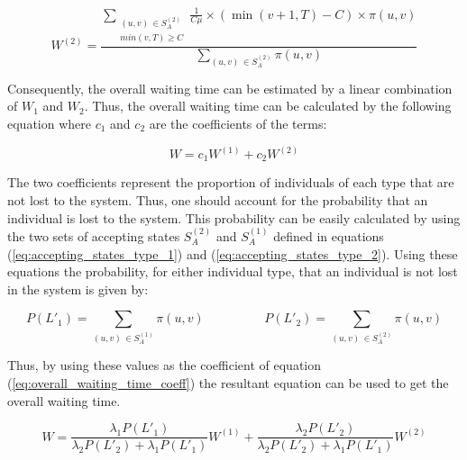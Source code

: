 \begin{equation}\label{eq:closed_form_waiting_type_2}
    W^{(2)} = \frac{\sum_{\substack{(u,v) \, \in S_A^{(2)} \\ min(v,T) \geq C}} 
    \frac{1}{C \mu} \times (\min(v+1,T)-C) \times \pi(u,v)}{\sum_{(u,v) \, 
    \in S_A^{(2)}} \pi(u,v)}
\end{equation}

Consequently, the overall waiting time can be estimated by a linear combination 
of \(W_1\) and \(W_2\). 
Thus, the overall waiting time can be calculated by the following equation where 
\(c_1\) and \(c_2\) are the coefficients of the terms:

\begin{equation}\label{eq:overall_waiting_time_coeff}
    W = c_1 W^{(1)} + c_2 W^{(2)}
\end{equation}

The two coefficients represent the proportion of individuals of each type that 
are not lost to the system.
Thus, one should account for the probability that an individual is lost to the 
system. 
This probability can be easily calculated by using the two sets of accepting 
states \(S_A^{(2)}\) and \(S_A^{(1)}\) defined in equations 
(\ref{eq:accepting_states_type_1}) and (\ref{eq:accepting_states_type_2}). 
Using these equations the probability, for either individual type, that an 
individual is not lost in the system is given by:

\begin{equation*}
    P(L'_1) = \sum_{(u,v) \, \in S_A^{(1)}} \pi(u,v) \hspace{2cm}
    P(L'_2) = \sum_{(u,v) \, \in S_A^{(2)}} \pi(u,v)
\end{equation*}
 
Thus, by using these values as the coefficient of equation 
(\ref{eq:overall_waiting_time_coeff}) the resultant equation can be used to get 
the overall waiting time. 

\begin{equation}\label{eq:overall_waiting_time}
    W = \frac{\lambda_1 P(L'_1)}{\lambda_2 P(L'_2) + \lambda_1 P(L'_1)} W^{(1)} + 
    \frac{\lambda_2 P(L'_2)}{\lambda_2 P(L'_2) + \lambda_1 P(L'_1)} W^{(2)}
\end{equation}
